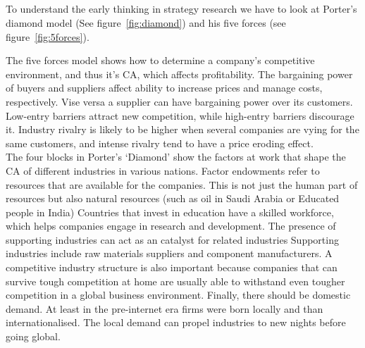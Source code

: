 \subsection{} %


To understand the early thinking in strategy research we have to look at Porter's diamond model (See figure~\ref{fig:diamond}) and his five forces (see figure~\ref{fig:5forces}).  


The five forces model shows how to determine a company's competitive environment, and thus it's \gls{CA}, which affects profitability. 
The bargaining power of buyers and suppliers affect ability to increase prices and manage costs, respectively. 
Vise versa a supplier can have bargaining power over its customers. Low-entry barriers attract new competition, while high-entry barriers discourage it. 
Industry rivalry is likely to be higher when several companies are vying for the same customers, and intense rivalry tend to have a price eroding effect.\\


The four blocks in Porter's `Diamond' show the factors at work that shape the \gls{CA} of different industries in various nations.
Factor endowments refer to resources that are available for the companies. This is not just the human part of resources but also natural resources (such as oil in Saudi Arabia or Educated people in India)
Countries that invest in education have a skilled workforce, which helps companies engage in research and development. 
The presence of supporting industries can act as an catalyst for related industries
Supporting industries include raw materials suppliers and component manufacturers. 
A competitive industry structure is also important because companies that can survive tough competition at home are usually able to withstand even tougher competition in a global business environment.
Finally, there should be domestic demand. At least in the pre-internet era firms were born locally and than internationalised. The local demand can propel industries to new nights before going global.